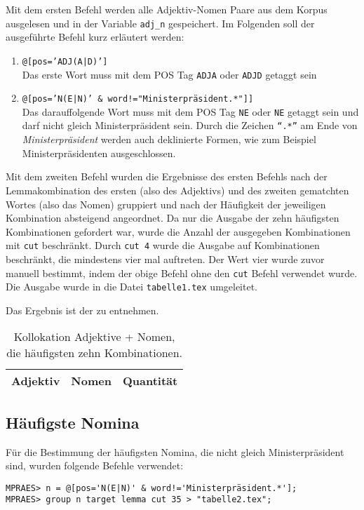 \documentclass[%
	type=document,%
  	style=article,%
  	media=print,
  	pages=oneside,%
  	prefixLecturer=Dozenten:,
  	author=multiple,
]{unihildesheim} %
\begin{document}
Mit dem ersten Befehl werden alle Adjektiv-Nomen Paare aus dem Korpus ausgelesen
und in der Variable \texttt{adj\_n} gespeichert. Im Folgenden soll der
ausgeführte Befehl kurz erläutert werden:
\begin{enumerate}
  \item \texttt{@[pos='ADJ(A|D)']} \\
			Das erste Wort muss mit dem POS Tag \texttt{ADJA} oder \texttt{ADJD} getaggt
			sein
  \item \texttt{@[pos='N(E|N)' \& word!="Ministerpräsident.*"]]} \\
			Das darauffolgende Wort muss mit dem POS Tag \texttt{NE} oder \texttt{NE}
			getaggt sein und darf nicht gleich Ministerpräsident sein. Durch die Zeichen
			\texttt{"`.*"'} am Ende von \textit{Ministerpräsident} werden auch
			deklinierte Formen, wie zum Beispiel Ministerpräsidenten ausgeschlossen.
\end{enumerate}

Mit dem zweiten Befehl wurden die Ergebnisse des ersten Befehls nach der
Lemmakombination des ersten (also des Adjektivs) und des zweiten gematchten
Wortes (also das Nomen) gruppiert und nach der Häufigkeit der jeweiligen
Kombination absteigend angeordnet. Da nur die Ausgabe der zehn häufigsten
Kombinationen gefordert war, wurde die Anzahl der ausgegeben Kombinationen
mit \texttt{cut} beschränkt. Durch \texttt{cut 4} wurde die Ausgabe auf
Kombinationen beschränkt, die mindestens vier mal auftreten. Der Wert vier wurde zuvor manuell
bestimmt, indem der obige Befehl ohne den \texttt{cut} Befehl verwendet wurde.
Die Ausgabe wurde in die Datei \texttt{tabelle1.tex} umgeleitet.

Das Ergebnis ist der  zu entnehmen.

\begin{table}[htpb]\label{t}
	\center
	\begin{tabularx}{0.6\textwidth}{llr}
		\toprule
		\textbf{Adjektiv} & \textbf{Nomen} & \textbf{Quantität}\\
		\midrule
		
		\bottomrule
	\end{tabularx}
	\caption{Kollokation Adjektive + Nomen, die häufigsten zehn Kombinationen.}
	\label{tab:adjektive_nomina}
\end{table}

\subsection{Häufigste Nomina}
Für die Bestimmung der häufigsten Nomina, die nicht gleich Ministerpräsident
sind, wurden folgende Befehle verwendet:
\begin{Verbatim}[frame=single,label=CQP,commandchars=\\\{\}]
MPRAES> n = @[pos='N(E|N)' & word!='Ministerpräsident.*'];
MPRAES> group n target lemma cut 35 > "tabelle2.tex";
\end{Verbatim}
\end{document}
